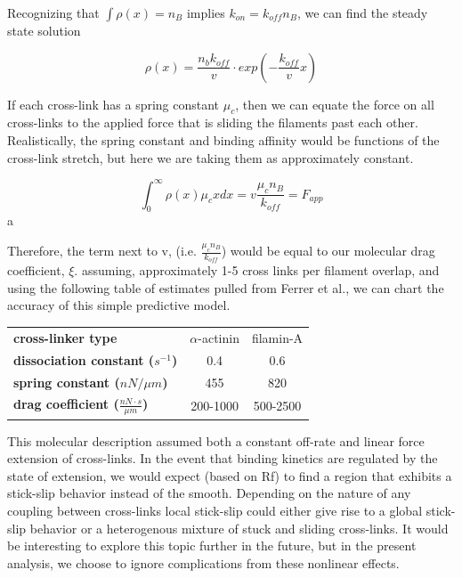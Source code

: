 \documentclass[pre,preprint]{revtex4-1}
\begin{document}
Recognizing that $\int \rho(x)=n_B$ implies $k_{on}=k_{off}n_B$, we can find the steady state solution

\begin{equation}
\rho(x) = \frac{n_b k_{off}}{v}\cdot exp\left ( -\frac{k_{off}}{v}x \right )
\end{equation}

If each cross-link has a spring constant $\mu_c$, then we can equate the force on all cross-links to the applied force that is sliding the filaments past each other.  Realistically, the spring constant and binding affinity would be functions of the cross-link stretch, but here we are taking them as approximately constant.  

\begin{equation}
\int_{0}^{\infty}\rho(x)\mu_cx dx = v \frac{\mu_c n_B}{k_{off}}= F_{app}
\end{equation}a

Therefore, the term next to v, (i.e. $\tfrac{\mu_c n_B}{k_{off}}$) would be equal to our molecular drag coefficient, $\xi$.  assuming, approximately 1-5 cross links per filament overlap, and using the following table of estimates pulled from Ferrer et al., we can chart the accuracy of this simple predictive model.

\begin{table}[h]
\begin{tabular}{| l | c | c |}
\hline
\textbf{cross-linker type} & $\alpha$-actinin & filamin-A  \\ \cline{1-1}
\textbf{dissociation constant ($s^{-1}$)} & 0.4 & 0.6 \\ \cline{1-1}
\textbf{spring constant ($nN / \mu m$)} & 455 & 820 \\ \cline{1-1}
\textbf{drag coefficient ($\tfrac{nN \cdot s}{\mu m}$)} & 200-1000 & 500-2500 \\ 
\hline
\end{tabular}
\end{table}



This molecular description assumed both a constant off-rate and linear force extension of cross-links.  In the event that binding kinetics are regulated by the state of extension, we would expect (based on Rf) to find a region that exhibits a stick-slip behavior instead of the smooth.  Depending on the nature of any coupling between cross-links local stick-slip could either give rise to a global stick-slip behavior or a heterogenous mixture of stuck and sliding cross-links.  It would be interesting to explore this topic further in the future, but in the present analysis, we choose to ignore complications from these nonlinear effects.
\end{document}
